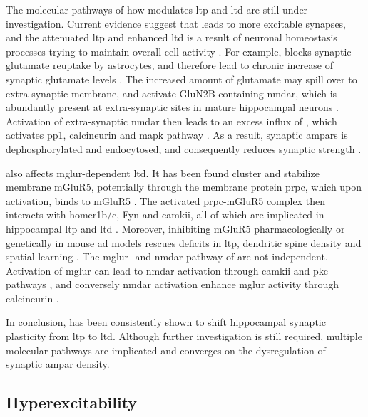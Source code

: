 The molecular pathways of how \abeta{} modulates \gls{ltp} and \gls{ltd} are still under investigation. Current evidence suggest that \abeta{} leads to more excitable synapses, and the attenuated \gls{ltp} and enhanced \gls{ltd} is a result of neuronal homeostasis processes trying to maintain overall cell activity \citep{guntupalli16, jang16}. For example, \abeta{} blocks synaptic glutamate reuptake by astrocytes, and therefore lead to chronic increase of synaptic glutamate levels \citep{matos08, li09}. The increased amount of glutamate may spill over to extra-synaptic membrane, and activate GluN2B-containing \gls{nmdar}, which is abundantly present at extra-synaptic sites in mature hippocampal neurons \citep{citri08, li11, shipton14}. Activation of extra-synaptic \gls{nmdar} then leads to an excess influx of , which activates \gls{pp1}, calcineurin and \gls{mapk} pathway \citep{hsieh06, shankar07, zhao10}. As a result, synaptic \glspl{ampar} is dephosphorylated and endocytosed, and consequently reduces synaptic strength \citep{hsieh06, liu10, minanomolina11}. 

\abeta{} also affects \gls{mglur}-dependent \gls{ltd}. It has been found \abeta{} cluster and stabilize membrane mGluR5, potentially through the membrane protein \gls{prpc}, which upon \abeta{} activation, binds to mGluR5 \citep{renner10, um13}. The activated \gls{prpc}-mGluR5 complex then interacts with homer1b/c, Fyn and \gls{camkii}, all of which are implicated in hippocampal \gls{ltp} and \gls{ltd} \citep{raka15, haas16}. Moreover, inhibiting mGluR5 pharmacologically or genetically in mouse \gls{ad} models rescues deficits in \gls{ltp}, dendritic spine density and spatial learning \citep{rammes11, hu14, um13, hamilton14}. The \gls{mglur}- and \gls{nmdar}-pathway of \abeta{} are not independent. Activation of \gls{mglur} can lead to \gls{nmdar} activation through \gls{camkii} and \gls{pkc} pathways \citep{chen11, jin15}, and conversely \gls{nmdar} activation enhance \gls{mglur} activity through calcineurin \citep{alagarsamy99, alagarsamy05}. 

In conclusion, \abeta{} has been consistently shown to shift hippocampal synaptic plasticity from \gls{ltp} to \gls{ltd}. Although further investigation is still required, multiple molecular pathways are implicated and converges on the dysregulation of synaptic \gls{ampar} density. 

\subsection{Hyperexcitability}

